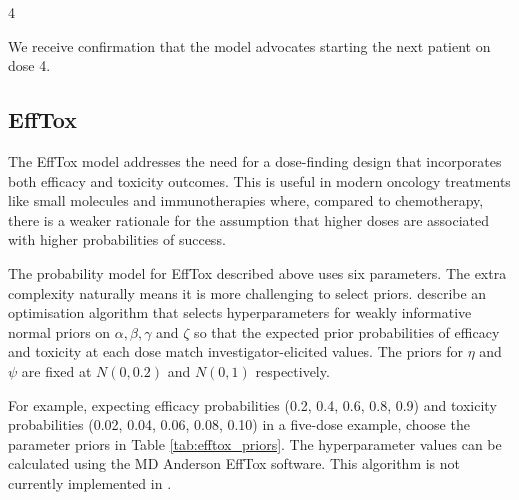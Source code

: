 \documentclass[article]{jss}
\begin{document}
\begin{CodeChunk}


\begin{CodeOutput}
[1] 4
\end{CodeOutput}
\end{CodeChunk}

We receive confirmation that the model advocates starting the next
patient on dose 4.

\hypertarget{efftox-1}{%
\subsection{EffTox}\label{efftox-1}}

The EffTox model addresses the need for a dose-finding design that
incorporates both efficacy and toxicity outcomes. This is useful in
modern oncology treatments like small molecules and immunotherapies
where, compared to chemotherapy, there is a weaker rationale for the
assumption that higher doses are associated with higher probabilities of
success.

The probability model for EffTox described above uses six parameters.
The extra complexity naturally means it is more challenging to select
priors. \citet{Thall2014} describe an optimisation algorithm that
selects hyperparameters for weakly informative normal priors on
\(\alpha, \beta, \gamma\) and \(\zeta\) so that the expected prior
probabilities of efficacy and toxicity at each dose match
investigator-elicited values. The priors for \(\eta\) and \(\psi\) are
fixed at \(N(0, 0.2)\) and \(N(0, 1)\) respectively.

For example, expecting efficacy probabilities (0.2, 0.4, 0.6, 0.8, 0.9)
and toxicity probabilities (0.02, 0.04, 0.06, 0.08, 0.10) in a five-dose
example, \citet{Thall2014} choose the parameter priors in Table
\ref{tab:efftox_priors}. The hyperparameter values can be calculated
using the MD Anderson EffTox software. This algorithm is not currently
implemented in .
\end{document}
